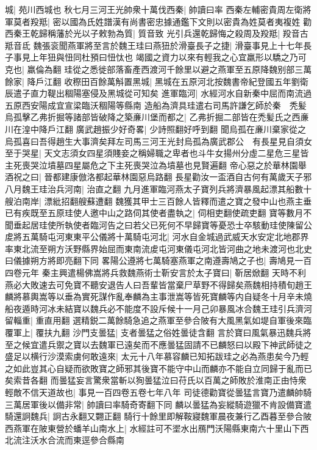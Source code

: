 城|{
	苑川西城也}
秋七月三河王光帥衆十萬伐西秦|{
	帥讀曰率}
西秦左輔密貴周左衛將軍莫者羖羝|{
	密以國為氏姓譜漢有尚書密忠據通鑑下文則以密貴為姓莫者夷複姓}
勸西秦王乾歸稱藩於光以子敕勃為質|{
	質音致}
光引兵還乾歸悔之殺周及羖羝|{
	羖音古羝音氐}
魏張衮聞燕軍將至言於魏王珪曰燕狃於滑臺長子之捷|{
	滑臺事見上十七年長子事見上年狃與忸同杜預曰忸忲也}
竭國之資力以來有輕我之心宜羸形以驕之乃可克也|{
	羸倫為翻}
珪從之悉徙部落畜產西渡河千餘里以避之燕軍至五原降魏别部三萬餘家|{
	降戶江翻}
收穄田百餘萬斛置黑城|{
	黑城在五原河北按魏書帝紀登國五年劉衛辰遣子直力鞮出稒陽塞侵及黑城從可知矣}
進軍臨河|{
	水經河水自新秦中屈而南流過五原西安陽成宜宣梁臨沃稒陽等縣南}
造船為濟具珪遣右司馬許謙乞師於秦　秃髪烏孤擊乙弗折掘等諸部皆破降之築亷川堡而都之|{
	乙弗折掘二部皆在禿髪氏之西亷川在湟中降戶江翻}
廣武趙振少好奇畧|{
	少詩照翻好呼到翻}
聞烏孤在亷川棄家從之烏孤喜曰吾得趙生大事濟矣拜左司馬三河王光封烏孤為廣武郡公　有長星見自須女至于哭星|{
	天文志須女四星須賤妾之稱婦職之卑者也斗牛女揚州分虛二星危三星皆主死喪哭泣墳墓四星屬危之下主死喪哭泣為墳墓也見賢遍翻}
帝心惡之於華林園舉酒祝之曰|{
	晉都建康倣洛都起華林園惡烏路翻}
長星勸汝一盃酒自古何有萬歲天子邪　八月魏王珪治兵河南|{
	治直之翻}
九月進軍臨河燕太子寶列兵將濟暴風起漂其船數十艘泊南岸|{
	漂紕招翻艘蘇遭翻}
魏獲其甲士三百餘人皆釋而遣之寶之發中山也燕主垂已有疾既至五原珪使人邀中山之路伺其使者盡執之|{
	伺相吏翻使疏吏翻}
寶等數月不聞垂起居珪使所執使者臨河告之曰若父已死何不早歸寶等憂恐士卒駭動珪使陳留公䖍將五萬騎屯河東東平公儀將十萬騎屯河北|{
	河水自金城過武威天水安定北地郡界率東北流至朔方沃野縣界始屈而東南流䖍屯河東儀屯河北皆河曲之地未渡河也北史曰儀據朔方將即亮翻下同}
畧陽公遵將七萬騎塞燕軍之南遵壽鳩之子也|{
	壽鳩見一百四卷元年}
秦主興遣楊佛嵩將兵救魏燕術士靳安言於太子寶曰|{
	靳居焮翻}
天時不利燕必大敗速去可免寶不聽安退告人曰吾輩皆當棄尸草野不得歸矣燕魏相持積旬趙王麟將慕輿嵩等以垂為實死謀作亂奉麟為主事泄嵩等皆死寶麟等内自疑冬十月辛未燒船夜遁時河冰未結寶以魏兵必不能度不設斥候十一月己卯暴風冰合魏王珪引兵濟河留輜重|{
	重直用翻}
選精鋭二萬餘騎急追之燕軍至參合陂有大風黑氣如堤自軍後來臨覆軍上|{
	覆扶九翻}
沙門支曇猛|{
	支者曇猛之俗姓曇徒含翻}
言於寶曰風氣暴迅魏兵將至之候宜遣兵禦之寶以去魏軍已遠矣而不應曇猛固請不已麟怒曰以殿下神武師徒之盛足以横行沙漠索虜何敢遠來|{
	太元十八年慕容麟已知拓跋珪之必為燕患矣今乃輕之如此豈其心自疑而欲敗寶之師邪其後寶不能守中山而麟亦不能自立同歸于亂而已矣索昔各翻}
而曇猛妄言驚衆當斬以狥曇猛泣曰苻氏以百萬之師敗於淮南正由恃衆輕敵不信天道故也|{
	事見一百四卷五卷七年八年}
司徒德勸寶從曇猛言寶乃遣麟帥騎三萬居軍後以備非常|{
	帥讀曰率騎奇寄翻下同}
麟以曇猛為妄縱騎遊獵不肯設備寶遣騎還詗魏兵|{
	詗古永翻又翾正翻}
騎行十餘里即解鞍寢魏軍晨夜兼行乙酉暮至參合陂西燕軍在陂東營於蟠羊山南水上|{
	水經註可不埿水出鴈門沃陽縣東南六十里山下西北流注沃水合流而東逕參合縣南}

